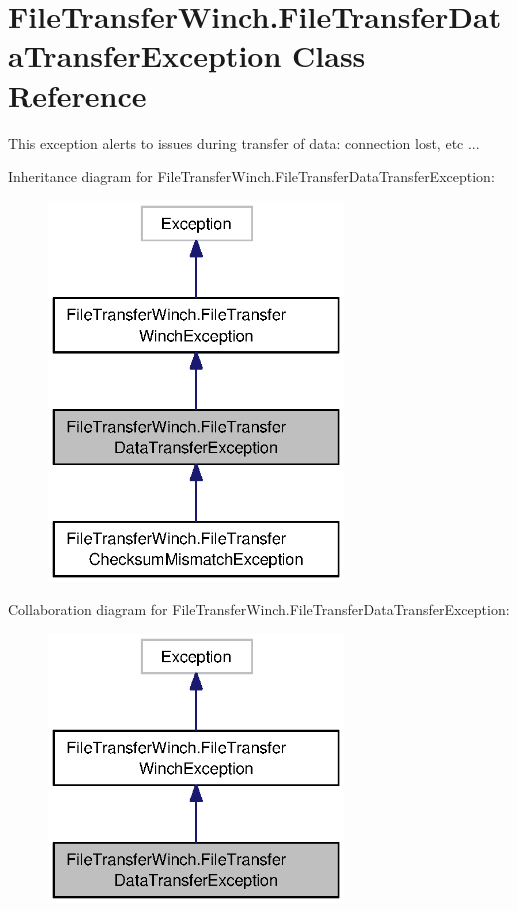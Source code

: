 \section{File\-Transfer\-Winch.\-File\-Transfer\-Data\-Transfer\-Exception Class Reference}
\label{classorg_1_1smallfoot_1_1filexfer_1_1FileTransferWinch_1_1FileTransferDataTransferException}


This exception alerts to issues during transfer of data\-: connection lost, etc ...  




Inheritance diagram for File\-Transfer\-Winch.\-File\-Transfer\-Data\-Transfer\-Exception\-:\nopagebreak
\begin{figure}[H]
\begin{center}
\leavevmode
\includegraphics[width=222pt]{classorg_1_1smallfoot_1_1filexfer_1_1FileTransferWinch_1_1FileTransferDataTransferException__inherit__graph}
\end{center}
\end{figure}


Collaboration diagram for File\-Transfer\-Winch.\-File\-Transfer\-Data\-Transfer\-Exception\-:\nopagebreak
\begin{figure}[H]
\begin{center}
\leavevmode
\includegraphics[width=222pt]{classorg_1_1smallfoot_1_1filexfer_1_1FileTransferWinch_1_1FileTransferDataTransferException__coll__graph}
\end{center}
\end{figure}

